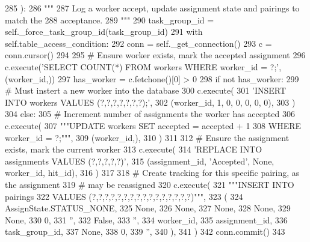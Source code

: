 \begin{DoxyCode}
285     ):
286         \textcolor{stringliteral}{"""}
287 \textcolor{stringliteral}{        Log a worker accept, update assignment state and pairings to match the}
288 \textcolor{stringliteral}{        acceptance.}
289 \textcolor{stringliteral}{        """}
290         task\_group\_id = self.\_force\_task\_group\_id(task\_group\_id)
291         with self.table\_access\_condition:
292             conn = self.\_get\_connection()
293             c = conn.cursor()
294 
295             \textcolor{comment}{# Ensure worker exists, mark the accepted assignment}
296             c.execute(\textcolor{stringliteral}{'SELECT COUNT(*) FROM workers WHERE worker\_id = ?;'}, (worker\_id,))
297             has\_worker = c.fetchone()[0] > 0
298             \textcolor{keywordflow}{if} \textcolor{keywordflow}{not} has\_worker:
299                 \textcolor{comment}{# Must instert a new worker into the database}
300                 c.execute(
301                     \textcolor{stringliteral}{'INSERT INTO workers VALUES (?,?,?,?,?,?,?);'},
302                     (worker\_id, 1, 0, 0, 0, 0, 0),
303                 )
304             \textcolor{keywordflow}{else}:
305                 \textcolor{comment}{# Increment number of assignments the worker has accepted}
306                 c.execute(
307                     \textcolor{stringliteral}{"""UPDATE workers SET accepted = accepted + 1}
308 \textcolor{stringliteral}{                             WHERE worker\_id = ?;"""},
309                     (worker\_id,),
310                 )
311 
312             \textcolor{comment}{# Ensure the assignment exists, mark the current worker}
313             c.execute(
314                 \textcolor{stringliteral}{'REPLACE INTO assignments VALUES (?,?,?,?,?)'},
315                 (assignment\_id, \textcolor{stringliteral}{'Accepted'}, \textcolor{keywordtype}{None}, worker\_id, hit\_id),
316             )
317 
318             \textcolor{comment}{# Create tracking for this specific pairing, as the assignment}
319             \textcolor{comment}{# may be reassigned}
320             c.execute(
321                 \textcolor{stringliteral}{"""INSERT INTO pairings}
322 \textcolor{stringliteral}{                         VALUES (?,?,?,?,?,?,?,?,?,?,?,?,?,?,?,?)"""},
323                 (
324                     AssignState.STATUS\_NONE,
325                     \textcolor{keywordtype}{None},
326                     \textcolor{keywordtype}{None},
327                     \textcolor{keywordtype}{None},
328                     \textcolor{keywordtype}{None},
329                     \textcolor{keywordtype}{None},
330                     0,
331                     \textcolor{stringliteral}{''},
332                     \textcolor{keyword}{False},
333                     \textcolor{stringliteral}{''},
334                     worker\_id,
335                     assignment\_id,
336                     task\_group\_id,
337                     \textcolor{keywordtype}{None},
338                     0,
339                     \textcolor{stringliteral}{''},
340                 ),
341             )
342             conn.commit()
343 
\end{DoxyCode}
